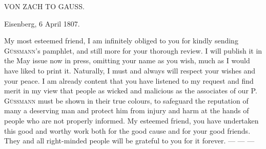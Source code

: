 \clearpage
\hypertarget{native-491-zach}{}
\label{native-491-zach}
\begin{center}
VON ZACH TO GAUSS.
\end{center}

\begin{flushright}Eisenberg, 6 April 1807.\end{flushright}

My most esteemed friend, I am infinitely obliged to you for kindly sending \textsc{Güssmann}’s pamphlet, and still more for your thorough review. I will publish it in the May issue now in press, omitting your name as you wish, much as I would have liked to print it. Naturally, I must and always will respect your wishes and your peace. I am already content that you have listened to my request and find merit in my view that people as wicked and malicious as the associates of our P. \textsc{Güssmann} must be shown in their true colours, to safeguard the reputation of many a deserving man and protect him from injury and harm at the hands of people who are not properly informed. My esteemed friend, you have undertaken this good and worthy work both for the good cause and for your good friends. They and all right-minded people will be grateful to you for it forever. --- --- ---
